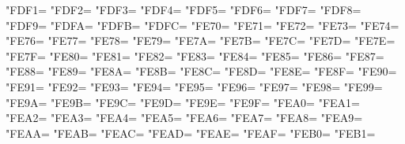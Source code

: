 \XeTeXcharclass"FDF1=\KclassArabU
\XeTeXcharclass"FDF2=\KclassArabU
\XeTeXcharclass"FDF3=\KclassArabU
\XeTeXcharclass"FDF4=\KclassArabU
\XeTeXcharclass"FDF5=\KclassArabU
\XeTeXcharclass"FDF6=\KclassArabU
\XeTeXcharclass"FDF7=\KclassArabU
\XeTeXcharclass"FDF8=\KclassArabU
\XeTeXcharclass"FDF9=\KclassArabU
\XeTeXcharclass"FDFA=\KclassArabU
\XeTeXcharclass"FDFB=\KclassArabU
\XeTeXcharclass"FDFC=\KclassArabU
\XeTeXcharclass"FE70=\KclassArabU
\XeTeXcharclass"FE71=\KclassArabU
\XeTeXcharclass"FE72=\KclassArabU
\XeTeXcharclass"FE73=\KclassArabU
\XeTeXcharclass"FE74=\KclassArabU
\XeTeXcharclass"FE76=\KclassArabU
\XeTeXcharclass"FE77=\KclassArabU
\XeTeXcharclass"FE78=\KclassArabU
\XeTeXcharclass"FE79=\KclassArabU
\XeTeXcharclass"FE7A=\KclassArabU
\XeTeXcharclass"FE7B=\KclassArabU
\XeTeXcharclass"FE7C=\KclassArabU
\XeTeXcharclass"FE7D=\KclassArabU
\XeTeXcharclass"FE7E=\KclassArabU
\XeTeXcharclass"FE7F=\KclassArabU
\XeTeXcharclass"FE80=\KclassArabU
\XeTeXcharclass"FE81=\KclassArabU
\XeTeXcharclass"FE82=\KclassArabU
\XeTeXcharclass"FE83=\KclassArabU
\XeTeXcharclass"FE84=\KclassArabU
\XeTeXcharclass"FE85=\KclassArabU
\XeTeXcharclass"FE86=\KclassArabU
\XeTeXcharclass"FE87=\KclassArabU
\XeTeXcharclass"FE88=\KclassArabU
\XeTeXcharclass"FE89=\KclassArabU
\XeTeXcharclass"FE8A=\KclassArabU
\XeTeXcharclass"FE8B=\KclassArabU
\XeTeXcharclass"FE8C=\KclassArabU
\XeTeXcharclass"FE8D=\KclassArabU
\XeTeXcharclass"FE8E=\KclassArabU
\XeTeXcharclass"FE8F=\KclassArabU
\XeTeXcharclass"FE90=\KclassArabU
\XeTeXcharclass"FE91=\KclassArabU
\XeTeXcharclass"FE92=\KclassArabU
\XeTeXcharclass"FE93=\KclassArabU
\XeTeXcharclass"FE94=\KclassArabU
\XeTeXcharclass"FE95=\KclassArabU
\XeTeXcharclass"FE96=\KclassArabU
\XeTeXcharclass"FE97=\KclassArabU
\XeTeXcharclass"FE98=\KclassArabU
\XeTeXcharclass"FE99=\KclassArabU
\XeTeXcharclass"FE9A=\KclassArabU
\XeTeXcharclass"FE9B=\KclassArabU
\XeTeXcharclass"FE9C=\KclassArabU
\XeTeXcharclass"FE9D=\KclassArabU
\XeTeXcharclass"FE9E=\KclassArabU
\XeTeXcharclass"FE9F=\KclassArabU
\XeTeXcharclass"FEA0=\KclassArabU
\XeTeXcharclass"FEA1=\KclassArabU
\XeTeXcharclass"FEA2=\KclassArabU
\XeTeXcharclass"FEA3=\KclassArabU
\XeTeXcharclass"FEA4=\KclassArabU
\XeTeXcharclass"FEA5=\KclassArabU
\XeTeXcharclass"FEA6=\KclassArabU
\XeTeXcharclass"FEA7=\KclassArabU
\XeTeXcharclass"FEA8=\KclassArabU
\XeTeXcharclass"FEA9=\KclassArabU
\XeTeXcharclass"FEAA=\KclassArabU
\XeTeXcharclass"FEAB=\KclassArabU
\XeTeXcharclass"FEAC=\KclassArabU
\XeTeXcharclass"FEAD=\KclassArabU
\XeTeXcharclass"FEAE=\KclassArabU
\XeTeXcharclass"FEAF=\KclassArabU
\XeTeXcharclass"FEB0=\KclassArabU
\XeTeXcharclass"FEB1=\KclassArabU
